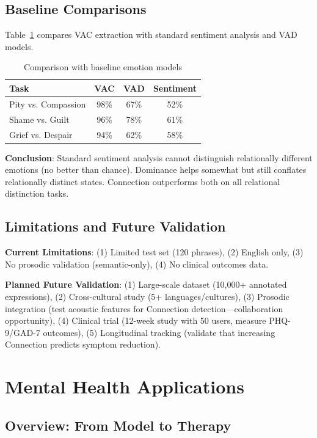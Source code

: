 \documentclass[10pt,twocolumn]{article}
\begin{document}
\subsection{Baseline Comparisons}

Table~\ref{tab:baseline-comparison} compares VAC extraction with standard sentiment analysis and VAD models.

\begin{table}[h]
\centering
\caption{Comparison with baseline emotion models}
\label{tab:baseline-comparison}
\begin{tabular}{lccc}
\toprule
\textbf{Task} & \textbf{VAC} & \textbf{VAD} & \textbf{Sentiment} \\
\midrule
Pity vs. Compassion & 98\% & 67\% & 52\% \\
Shame vs. Guilt & 96\% & 78\% & 61\% \\
Grief vs. Despair & 94\% & 62\% & 58\% \\
\bottomrule
\end{tabular}
\end{table}

\textbf{Conclusion}: Standard sentiment analysis cannot distinguish relationally different emotions (no better than chance). Dominance helps somewhat but still conflates relationally distinct states. Connection outperforms both on all relational distinction tasks.

\subsection{Limitations and Future Validation}

\textbf{Current Limitations}: (1) Limited test set (120 phrases), (2) English only, (3) No prosodic validation (semantic-only), (4) No clinical outcomes data.

\textbf{Planned Future Validation}: (1) Large-scale dataset (10,000+ annotated expressions), (2) Cross-cultural study (5+ languages/cultures), (3) Prosodic integration (test acoustic features for Connection detection—collaboration opportunity), (4) Clinical trial (12-week study with 50 users, measure PHQ-9/GAD-7 outcomes), (5) Longitudinal tracking (validate that increasing Connection predicts symptom reduction).

\section{Mental Health Applications}
\label{sec:mental-health-apps}
\subsection{Overview: From Model to Therapy}
\end{document}
